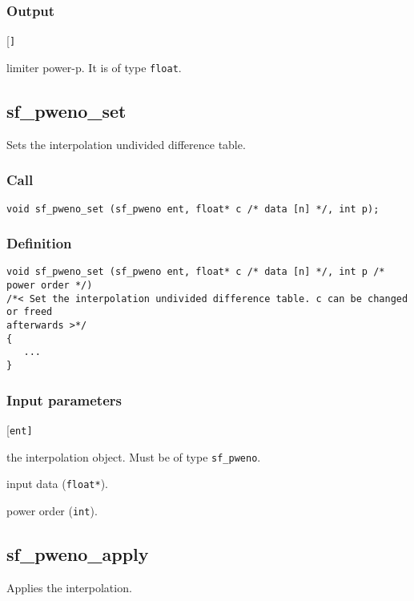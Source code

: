 \subsubsection*{Output}
\begin{desclist}{\tt }{\quad}[\tt ]
   \setlength\itemsep{0pt}
   \item[mins * power] limiter power-p. It is of type \texttt{float}.
\end{desclist}




\subsection{{sf\_pweno\_set}}
Sets the interpolation undivided difference table.

\subsubsection*{Call}
\begin{verbatim}void sf_pweno_set (sf_pweno ent, float* c /* data [n] */, int p);\end{verbatim}

\subsubsection*{Definition}
\begin{verbatim}
void sf_pweno_set (sf_pweno ent, float* c /* data [n] */, int p /* power order */)
/*< Set the interpolation undivided difference table. c can be changed or freed 
afterwards >*/
{
   ...
}
\end{verbatim}

\subsubsection*{Input parameters}
\begin{desclist}{\tt }{\quad}[\tt ent]
   \setlength\itemsep{0pt}
   \item[ent] the interpolation object. Must be of type \texttt{sf\_pweno}. 
   \item[c] input data (\texttt{float*}).  
   \item[p] power order (\texttt{int}).  
\end{desclist}




\subsection{{sf\_pweno\_apply}}
Applies the interpolation.

